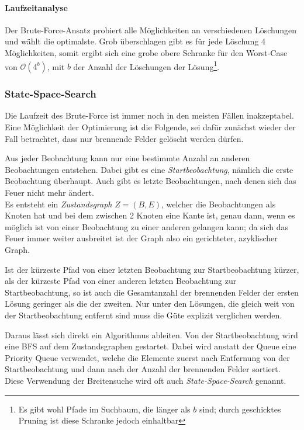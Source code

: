 \paragraph{Laufzeitanalyse}

Der Brute-Force-Ansatz probiert alle Möglichkeiten an verschiedenen Löschungen und wählt die optimalste. Grob überschlagen gibt es für jede Löschung 4 Möglichkeiten, somit ergibt sich eine grobe obere Schranke für den Worst-Case von $\mathcal{O}(4^b)$, mit $b$ der Anzahl der Löschungen der Lösung\footnote{Es gibt wohl Pfade im Suchbaum, die länger als $b$ sind; durch geschicktes Pruning ist diese Schranke jedoch einhaltbar}. 

\subsubsection*{State-Space-Search}

Die Laufzeit des Brute-Force ist immer noch in den meisten Fällen inakzeptabel. Eine Möglichkeit der Optimierung ist die Folgende, sei dafür zunächst wieder der Fall betrachtet, dass nur brennende Felder gelöscht werden dürfen.

Aus jeder Beobachtung kann nur eine bestimmte Anzahl an anderen Beobachtungen entstehen. Dabei gibt es eine \emph{Startbeobachtung}, nämlich die erste Beobachtung überhaupt. Auch gibt es letzte Beobachtungen, nach denen sich das Feuer nicht mehr ändert. \\
Es entsteht ein \emph{Zustandsgraph} $Z = (B,E)$, welcher die Beobachtungen als Knoten hat und bei dem zwischen 2 Knoten eine Kante ist, genau dann, wenn es möglich ist von einer Beobachtung zu einer anderen gelangen kann; da sich das Feuer immer weiter ausbreitet ist der Graph also ein gerichteter, azyklischer Graph.

Ist der kürzeste Pfad von einer letzten Beobachtung zur Startbeobachtung kürzer, als der kürzeste Pfad von einer anderen letzten Beobachtung zur Startbeobachtung, so ist auch die Gesamtanzahl der brennenden Felder der ersten Lösung geringer als die der zweiten. Nur unter den Lösungen, die gleich weit von der Startbeobachtung entfernt sind muss die Güte explizit verglichen werden.

Daraus lässt sich direkt ein Algorithmus ableiten. Von der Startbeobachtung wird eine BFS auf dem Zustandsgraphen gestartet. Dabei wird anstatt der Queue eine Priority Queue verwendet, welche die Elemente zuerst nach Entfernung von der Startbeobachtung und dann nach der Anzahl der brennenden Felder sortiert. Diese Verwendung der Breitensuche wird oft auch \emph{State-Space-Search} genannt.


